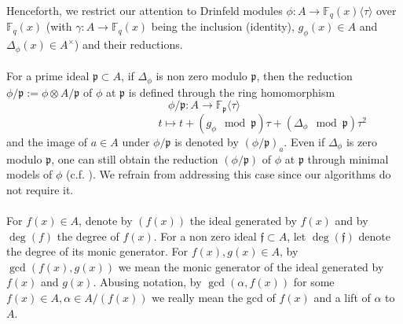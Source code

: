\documentclass[12pt]{article}
\theoremstyle{plain}
\theoremstyle{definition}
\def\F{\ensuremath{\mathbb{F}}}
\newcommand{\ph}{(\phi/\p)}
\newcommand{\p}{\mathfrak p}
\newcommand{\f}{\mathfrak f}
\begin{document}
Henceforth, we restrict our attention to Drinfeld modules $\phi:A \longrightarrow \F_q(x)\langle\tau\rangle$ over $\F_q(x)$ (with $\gamma : A \rightarrow \F_q(x)$ being the inclusion (identity), $g_\phi(x)\in A$ and $\Delta_\phi(x)\in A^\times$) and their reductions.\\ \\
For a prime ideal $\p \subset A$, if $\Delta_\phi$ is non zero modulo $\p$, then the reduction $\phi/\p := \phi \otimes A/\p$ of $\phi$ at $\p$ is defined through the ring homomorphism $$\phi/\p : A \longrightarrow \F_\p\langle \tau \rangle$$ $$\ \ \ \ \ \ \ \ \ \ \ \ \ \ \ \ \ \ \ \ \ \ \ \ \ \ \ \ \ \ \ \ \ \ \ \ \ \ \ \ \ \ \ \ \ \ \ \ t \longmapsto t + (g_\phi \mod \p) \tau + (\Delta_\phi\mod\p) \tau^2$$
and the image of $a \in A$ under $\phi/\p$ is denoted by $(\phi/\p)_a$. Even if $\Delta_{\phi}$ is zero modulo $\p$, one can still obtain the reduction $(\phi/\p)$ of $\phi$ at $\p$ through minimal models of $\phi$ (c.f. \cite{gek1}). We refrain from addressing this case since our algorithms do not require it.\\ \\
For $f(x) \in A$, denote by $(f(x))$ the ideal generated by $f(x)$ and by $\deg(f)$ the degree of 
$f(x)$. For a non zero ideal $\f \subset A$, let $\deg(\f)$ denote the degree of its monic 
generator. For $f(x),g(x) \in A$, by $\gcd(f(x),g(x))$ we mean the monic generator of the ideal 
generated by $f(x)$ and $g(x)$. Abusing notation, by $\gcd(\alpha,f(x))$ for some $f(x) \in A, 
\alpha \in A/(f(x))$ we really mean the gcd of $f(x)$ and a lift of $\alpha$ to $A$.
\end{document}
